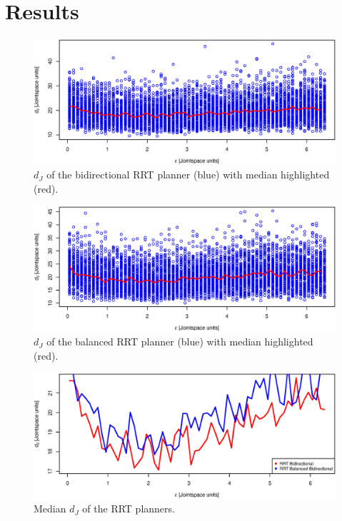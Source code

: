 \section{Results} 

\begin{figure}[h]
 \centering
 \includegraphics[width=\figsize]{graphics/bidirectional_correlation}
 \caption{\(d_J\) of the bidirectional RRT planner (blue) with median highlighted (red).}
 \label{fig:bidir_correlated}
\end{figure}

\begin{figure}[h]
 \centering
 \includegraphics[width=\figsize]{graphics/balanced_correlation}
 \caption{\(d_J\) of the balanced RRT planner (blue) with median highlighted (red).}
 \label{fig:balanced_correlated}
\end{figure}


\begin{figure}[h]
 \centering
 \includegraphics[width=\figsize]{graphics/compare_distance}
 \caption{Median \(d_J\) of the RRT planners.}
 \label{fig:balanced_correlated}
\end{figure}


